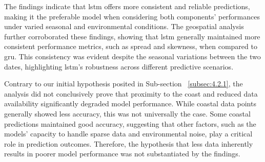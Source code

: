 The findings indicate that \acrshort{lstm} offers more consistent and reliable predictions, making it the preferable model when considering both components' performances under varied seasonal and environmental conditions. The geospatial analysis further corroborated these findings, showing that \acrshort{lstm} generally maintained more consistent performance metrics, such as spread and skewness, when compared to \acrshort{gru}. This consistency was evident despite the seasonal variations between the two dates, highlighting \acrshort{lstm}'s robustness across different predictive scenarios.

Contrary to our initial hypothesis posited in Sub-section ~\ref{subsec:4.2.1}, the analysis did not conclusively prove that proximity to the coast and reduced data availability significantly degraded model performance. While coastal data points generally showed less accuracy, this was not universally the case. Some coastal predictions maintained good accuracy, suggesting that other factors, such as the models' capacity to handle sparse data and environmental noise, play a critical role in prediction outcomes. Therefore, the hypothesis that less data inherently results in poorer model performance was not substantiated by the findings.
